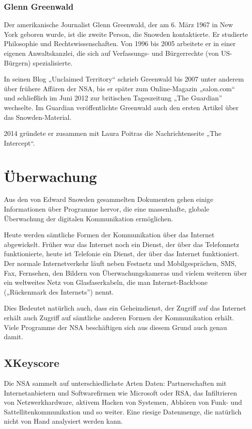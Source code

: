 \documentclass[12pt,a4paper]{scrartcl}
\begin{document}
\subsubsection{Glenn Greenwald}
Der amerikanische Journalist Glenn Greenwald, der am 6. März 1967 in New York geboren wurde, ist die zweite Person, die Snowden kontaktierte. Er studierte Philosophie und Rechtswissenschaften.\cite{wiki_greenwald} Von 1996 bis 2005 arbeitete er in einer eigenen Anwaltskanzlei, die sich auf Verfassungs- und Bürgerrechte (von US-Bürgern) spezialisierte.\cite{unclaimed_response}

In seinen Blog „Unclaimed Territory“ schrieb Greenwald bis 2007 unter anderem über frühere Affären der NSA, bis er später zum Online-Magazin „salon.com“ und schließlich im Juni 2012 zur britischen Tageszeitung „The Guardian” wechselte. Im Guardian veröffentlichte Greenwald auch den ersten Artikel über das Snowden-Material.\cite{wiki_greenwald}

2014 gründete er zusammen mit Laura Poitras die Nachrichtenseite „The Intercept“.\cite{intercept_about}

\section{Überwachung}
Aus den von Edward Snowden gesammelten Dokumenten gehen einige Informationen über Programme hervor, die eine massenhafte, globale Überwachung der digitalen Kommunikation ermöglichen.

Heute werden sämtliche Formen der Kommunikation über das Internet abgewickelt. Früher war das Internet noch ein Dienst, der über das Telefonnetz funktionierte, heute ist Telefonie ein Dienst, der über das Internet funktioniert. Der normale Internetverkehr läuft neben Festnetz und Mobilgesprächen, SMS, Fax, Fernsehen, den Bildern von Überwachungskameras und vielem weiteren über ein weltweites Netz von Glasfaserkabeln, die man Internet-Backbone („Rückenmark des Internets”) nennt.

Dies Bedeutet natürlich auch, dass ein Geheimdienst, der Zugriff auf das Internet erhält auch Zugriff auf sämtliche anderen Formen der Kommunikation erhält. Viele Programme der NSA beschäftigen sich aus diesem Grund auch genau damit.

\subsection{XKeyscore}
Die NSA sammelt auf unterschiedlichste Arten Daten: Partnerschaften mit Internetanbietern und Softwarefirmen wie Microsoft oder RSA, das Infiltrieren von Netzwerkhardware, aktivem Hacken von Systemen, Abhören von Funk- und Sattellitenkommunikation und so weiter. Eine riesige Datenmenge, die natürlich nicht von Hand analysiert werden kann.
\end{document}

